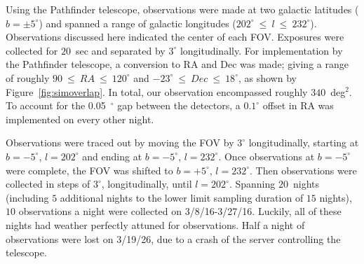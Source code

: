 \documentclass[aps,prb,twocolumn,superscriptaddress]{revtex4-1}
\begin{document}
Using the Pathfinder telescope, observations were made at two galactic latitudes ($b=\pm5^{\circ}$) and spanned a range of galactic longitudes ($202^{\circ}~\leq~l~\leq~232^{\circ}$).  Observations discussed here indicated the center of each FOV.  
Exposures were collected for $20$~sec and separated by $3^{\circ}$ longitudinally.  For implementation by the Pathfinder telescope, a conversion to RA and Dec was made; giving a range of roughly $90~\leq~RA~\leq~120^{\circ}$ and $-23^{\circ}~\leq~Dec~\leq~18^{\circ}$, as shown by Figure~\ref{fig:simoverlap}.  In total, our observation encompassed roughly $340$~deg$^{2}$.  To account for the 0.05~$^{\circ}$ gap between the detectors, a $0.1^{\circ}$ offset in RA was implemented on every other night.  

\indent Observations were traced out by moving the FOV by $3^{\circ}$ longitudinally, starting at $b=-5^{\circ}$, $l=202^{\circ}$ and ending at $b=-5^{\circ}$, $l=232^{\circ}$.  Once observations at $b=-5^{\circ}$ were complete, the FOV was shifted to $b=+5^{\circ}$, $l=232^{\circ}$. Then observations were collected in steps of $3^{\circ}$, longitudinally, until $l=202^{\circ}$.  Spanning $20$~nights (including $5$ additional nights to the lower limit sampling duration of $15$ nights), $10$ observations a night were collected on 3/8/16-3/27/16.  Luckily, all of these nights had weather perfectly attuned for observations.  Half a night of observations were lost on 3/19/26, due to a crash of the server controlling the telescope.



\end{document}
